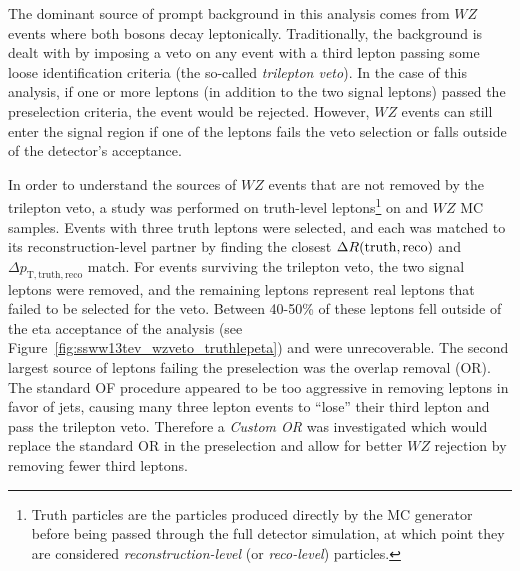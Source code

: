 The dominant source of prompt background in this analysis comes from $WZ$ events where both bosons decay leptonically.
Traditionally, the background is dealt with by imposing a veto on any event with a third lepton passing some loose identification criteria (the so-called \emph{trilepton veto}).
In the case of this analysis, if one or more leptons (in addition to the two signal leptons) passed the preselection criteria, the event would be rejected.
However, $WZ$ events can still enter the signal region if one of the leptons fails the veto selection or falls outside of the detector's acceptance.

In order to understand the sources of $WZ$ events that are not removed by the trilepton veto, a study was performed on truth-level leptons\footnote{Truth particles are the particles produced directly by the MC generator before being passed through the full detector simulation, at which point they are considered \emph{reconstruction-level} (or \emph{reco-level}) particles.} on \ssww and $WZ$ MC samples.
Events with three truth leptons were selected, and each was matched to its reconstruction-level partner by finding the closest $\Delta R(\textrm{truth},\textrm{reco})$ and $\Delta p_{\textrm{T},\textrm{truth},\textrm{reco}}$ match.
For events surviving the trilepton veto, the two signal leptons were removed, and the remaining leptons represent real leptons that failed to be selected for the veto.
Between 40-50\% of these leptons fell outside of the eta acceptance of the analysis (see Figure~\ref{fig:ssww13tev_wzveto_truthlepeta}) and were unrecoverable.
The second largest source of leptons failing the preselection was the overlap removal (OR). 
The standard OF procedure appeared to be too aggressive in removing leptons in favor of jets, causing many three lepton events to ``lose'' their third lepton and pass the trilepton veto.
Therefore a \emph{Custom OR} was investigated which would replace the standard OR in the preselection and allow for better $WZ$ rejection by removing fewer third leptons.


